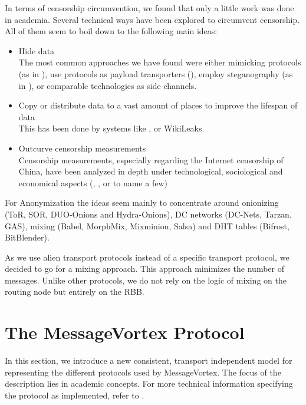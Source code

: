 \documentclass[10pt,journal,compsoc]{IEEEtran}
\begin{document}
In terms of censorship circumvention, we found that only a little work was done in academia. Several technical ways have been explored to circumvent censorship. All of them seem to boil down to the following main ideas:
\begin{itemize}
	\item Hide data\\
	The most common approaches we have found were either mimicking protocols (as in \cite{mohajeri2013skypemorph}), use protocols as payload transporters (\cite{AthanRAM07}), employ steganography (as in \cite{f5}), or comparable technologies as side channels.
	\item Copy or distribute data to a vast amount of places to improve the lifespan of data\\
	This has been done by systems like \cite{freenet}, or WikiLeaks.
	\item Outcurve censorship measurements\\
	Censorship measurements, especially regarding the Internet censorship of China, have been analyzed in depth under technological, sociological and economical aspects (\cite{Ensafi_2015}, \cite{Clayton_2006}, or \cite{lowe2007great} to name a few)
\end{itemize}

For Anonymization the ideas seem mainly to concentrate around onionizing (ToR\cite{tor-spec}, SOR\cite{Egners_2012}, DUO-Onions and Hydra-Onions\cite{iwanik2005duo}), DC networks (DC-Nets\cite{chaum-dc}, Tarzan\cite{tarzan:ccs02}, GAS\cite{AthanRAM07}), mixing (Babel\cite{babel}, MorphMix\cite{morphmix:wpes2002}, Mixminion\cite{minion-design}, Salsa\cite{Salsa}) and DHT tables (Bifrost\cite{Kondo2009}, BitBlender\cite{Bauer_2008}).

As we use alien transport protocols instead of a specific transport protocol, we decided to go for a mixing approach. This approach minimizes the number of messages. Unlike other protocols, we do not rely on the logic of mixing on the routing node but entirely on the RBB. 

\section{The MessageVortex Protocol}
In this section, we introduce a new consistent, transport independent model for representing the different protocols used by MessageVortex. The focus of the description lies in academic concepts. For more technical information specifying the protocol as implemented, refer to \cite{MessageVortexRFC}. 
\end{document}

